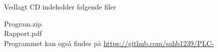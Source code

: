 Vedlagt CD indeholder følgende filer

\noindent Program.zip\\
\noindent Rapport.pdf\\

\noindent Programmet kan også findes på \url{https://github.com/sahb1239/PLC-}